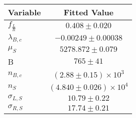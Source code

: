 \begin{tabular}[t]{lc}
\hline
Variable &Fitted Value\\
\hline\hline
$f_{\frac{L}{R}}$&$0.408\pm0.020$\\
\hline
$\lambda_{B,c}$&$-0.00249\pm0.00038$\\
\hline
$\mu_S$&$5278.872\pm0.079$\\
\hline
B&$765\pm41$\\
\hline
$n_{B,c}$&$(2.88\pm0.15)\times 10^3$\\
\hline
$n_S$&$(4.840\pm0.026)\times 10^4$\\
\hline
$\sigma_{L, S}$&$10.79\pm0.22$\\
\hline
$\sigma_{R, S}$&$17.74\pm0.21$\\
\hline
\end{tabular}